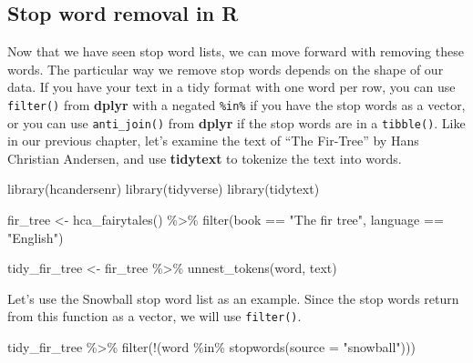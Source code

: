 \documentclass[
]{krantz}
\makeatletter
\newenvironment{Shaded}{\begin{snugshade}}{\end{snugshade}}
\newcommand{\AttributeTok}[1]{\textcolor[rgb]{0.77,0.63,0.00}{#1}}
\newcommand{\FunctionTok}[1]{\textcolor[rgb]{0.00,0.00,0.00}{#1}}
\newcommand{\NormalTok}[1]{#1}
\newcommand{\OtherTok}[1]{\textcolor[rgb]{0.56,0.35,0.01}{#1}}
\newcommand{\SpecialCharTok}[1]{\textcolor[rgb]{0.00,0.00,0.00}{#1}}
\newcommand{\StringTok}[1]{\textcolor[rgb]{0.31,0.60,0.02}{#1}}
\newenvironment{kframe}{%
\medskip{}
\setlength{\fboxsep}{.8em}
 \def\at@end@of@kframe{}%
 \ifinner\ifhmode%
  \def\at@end@of@kframe{\end{minipage}}%
  \begin{minipage}{\columnwidth}%
 \fi\fi%
 \def\FrameCommand##1{\hskip\@totalleftmargin \hskip-\fboxsep
 \colorbox{shadecolor}{##1}\hskip-\fboxsep
     \hskip-\linewidth \hskip-\@totalleftmargin \hskip\columnwidth}%
 \MakeFramed {\advance\hsize-\width
   \@totalleftmargin\z@ \linewidth\hsize
   \@setminipage}}%
 {\par\unskip\endMakeFramed%
 \at@end@of@kframe}
\renewenvironment{Shaded}{\begin{kframe}}{\end{kframe}}
\makeatother
\begin{document}
\hypertarget{stop-word-removal-in-r}{%
\subsection{Stop word removal in R}\label{stop-word-removal-in-r}}

Now that we have seen stop word lists, we can move forward with removing these words. The particular way we remove stop words depends on the shape of our data. If you have your text in a tidy format with one word per row, you can use \texttt{filter()} from \textbf{dplyr} with a negated \texttt{\%in\%} if you have the stop words as a vector, or you can use \texttt{anti\_join()} from \textbf{dplyr} if the stop words are in a \texttt{tibble()}. Like in our previous chapter, let's examine the text of ``The Fir-Tree'' by Hans Christian Andersen, and use \textbf{tidytext} to tokenize the text into words.

\begin{Shaded}
\begin{Highlighting}[]
\FunctionTok{library}\NormalTok{(hcandersenr)}
\FunctionTok{library}\NormalTok{(tidyverse)}
\FunctionTok{library}\NormalTok{(tidytext)}

\NormalTok{fir\_tree }\OtherTok{\textless{}{-}} \FunctionTok{hca\_fairytales}\NormalTok{() }\SpecialCharTok{\%\textgreater{}\%}
  \FunctionTok{filter}\NormalTok{(book }\SpecialCharTok{==} \StringTok{"The fir tree"}\NormalTok{,}
\NormalTok{         language }\SpecialCharTok{==} \StringTok{"English"}\NormalTok{)}

\NormalTok{tidy\_fir\_tree }\OtherTok{\textless{}{-}}\NormalTok{ fir\_tree }\SpecialCharTok{\%\textgreater{}\%}
  \FunctionTok{unnest\_tokens}\NormalTok{(word, text)}
\end{Highlighting}
\end{Shaded}

Let's use the Snowball stop word list as an example. Since the stop words return from this function as a vector, we will use \texttt{filter()}.

\begin{Shaded}
\begin{Highlighting}[]
\NormalTok{tidy\_fir\_tree }\SpecialCharTok{\%\textgreater{}\%}
  \FunctionTok{filter}\NormalTok{(}\SpecialCharTok{!}\NormalTok{(word }\SpecialCharTok{\%in\%} \FunctionTok{stopwords}\NormalTok{(}\AttributeTok{source =} \StringTok{"snowball"}\NormalTok{)))}
\end{Highlighting}
\end{Shaded}
\end{document}

